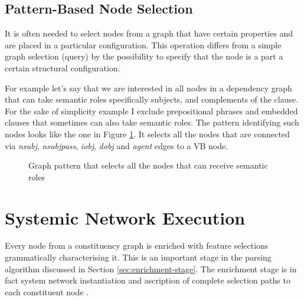  
\subsection{Pattern-Based Node Selection}
It is often needed to select nodes from a graph that have certain properties and are placed in a particular configuration. This operation differs from a simple graph selection (query) by the possibility to specify that the node is a part a certain structural configuration. 

For example let's say that we are interested in all nodes in a dependency graph that can take semantic roles specifically subjects, and complements of the clause. For the sake of simplicity example I exclude prepositional phrases and embedded clauses that sometimes can also take semantic roles. 
The pattern identifying such nodes looks like the one in Figure \ref{fig:gp3}. It selects all the nodes that are connected via \textit{nsubj}, \textit{nsubjpass}, \textit{iobj}, \textit{dobj} and \textit{agent} edges to a VB node. 

\begin{figure}[hbtp]
\centering
{}
\caption{Graph pattern that selects all the nodes that can receive semantic roles}
\label{fig:gp3}
\end{figure}



\section{Systemic Network Execution}
\label{sec:system-network-execution}
Every node from a constituency graph is enriched with feature selections grammatically characterising it. This is an important stage in the parsing algorithm discussed in Section \ref{sec:enrichment-stage}. The enrichment stage is in fact system network instantiation and ascription of complete selection paths to each constituent node . 

